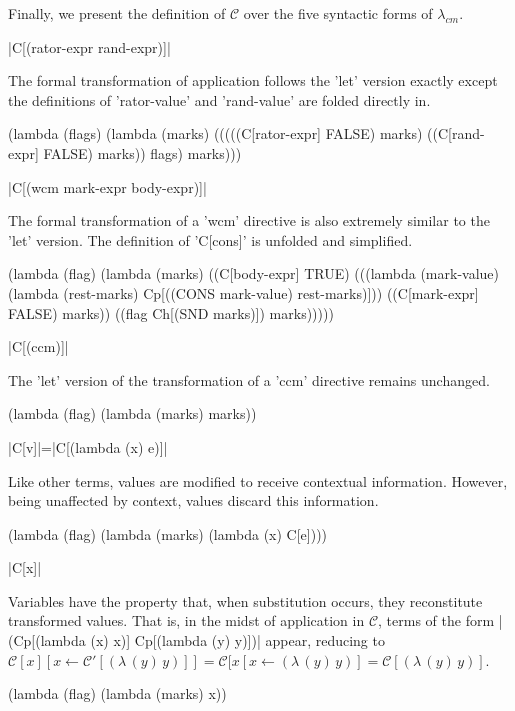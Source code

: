\documentclass{llncs}
\newcommand{\cm}[0]{$\lambda_{cm}$}
\newcommand{\abs}[2]{(\lambda\,(#1)\,#2)}
\newcommand{\C}[1]{\mathcal{C}[#1]}
\newcommand{\Cp}[1]{\mathcal{C}'[#1]}
\begin{document}
Finally, we present the definition of $\mathcal{C}$ over the five syntactic forms of \cm.


\begin{schemedefn}{\scheme|C[(rator-expr rand-expr)]|}

The formal transformation of application follows the \scheme'let' version exactly except the definitions of \scheme'rator-value' and \scheme'rand-value' are folded directly in.
\begin{schemedisplay}
(lambda (flags)
  (lambda (marks)
    (((((C[rator-expr] FALSE) marks)
       ((C[rand-expr] FALSE) marks))
      flags)
     marks)))
\end{schemedisplay}
\end{schemedefn}

\begin{schemedefn}{\scheme|C[(wcm mark-expr body-expr)]|}

The formal transformation of a \scheme'wcm' directive is also extremely similar to the \scheme'let' version. The definition of \scheme'C[cons]' is unfolded and simplified.
\begin{schemedisplay}
(lambda (flag)
  (lambda (marks)
    ((C[body-expr] TRUE)
     (((lambda (mark-value) (lambda (rest-marks) Cp[((CONS mark-value) rest-marks)]))
       ((C[mark-expr] FALSE) marks))
      ((flag Ch[(SND marks)]) marks)))))
\end{schemedisplay}
\end{schemedefn}

\begin{schemedefn}{\scheme|C[(ccm)]|}

The \scheme'let' version of the transformation of a \scheme'ccm' directive remains unchanged.
\begin{schemedisplay}
(lambda (flag)
  (lambda (marks)
    marks))
\end{schemedisplay}
\end{schemedefn}

\begin{schemedefn}{\scheme|C[v]|=\scheme|C[(lambda (x) e)]|}

Like other terms, values are modified to receive contextual information. However, being unaffected by context, values discard this information.
\begin{schemedisplay}
(lambda (flag)
  (lambda (marks)
    (lambda (x) C[e])))
\end{schemedisplay}
\end{schemedefn}


\begin{schemedefn}{\scheme|C[x]|}

Variables have the property that, when substitution occurs, they reconstitute transformed values. That is, in the midst of application in $\mathcal{C}$, terms of the form \scheme|(Cp[(lambda (x) x)] Cp[(lambda (y) y)])| appear, reducing to $\C{x}[x\leftarrow \Cp{\abs{y}{y}}]=\C{x[x\leftarrow\abs{y}{y}}=\C{\abs{y}{y}}$.
\begin{schemedisplay}
(lambda (flag)
  (lambda (marks)
    x))
\end{schemedisplay}
\end{schemedefn}
\end{document}
